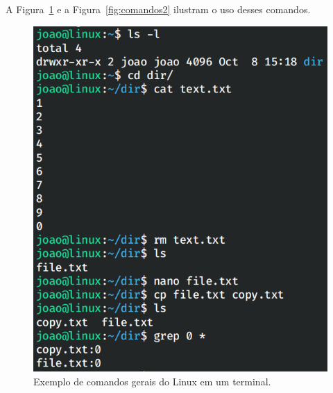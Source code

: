 \documentclass[
	12pt,				%
	oneside,   	        %
	a4paper,			%
	english,			%
	french,				%
	spanish,			%
	brazil,				%
	]{pacotes/abntex2}
\begin{document}
A Figura~\ref{fig:comandos} e a Figura~\ref{fig:comandos2} ilustram o uso desses comandos.

\begin{figure}[H]
  \centering
  \includegraphics[scale=0.5]{figuras/commons.png}
  \caption{Exemplo de comandos gerais do Linux em um terminal.}
  \label{fig:comandos}
\end{figure}
\end{document}

